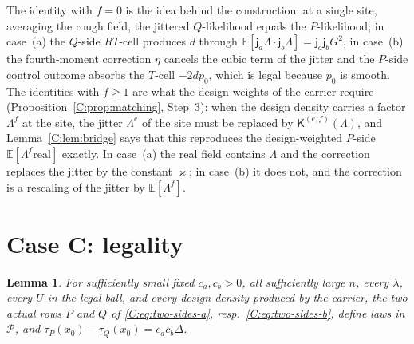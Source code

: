 \documentclass[11pt]{article}
\newtheorem{lemma}[lemma]{Lemma}
\newcommand{\E}{\mathbb{E}}
\newcommand{\cP}{\mathcal{P}}
\newcommand{\ja}{\mathsf{j}_a}
\newcommand{\jb}{\mathsf{j}_b}
\newcommand{\K}{\mathsf{K}}
\newcommand{\real}{\mathrm{real}}
\begin{document}
The identity with \(f=0\) is the idea behind the construction: at a
single site, averaging the rough field, the jittered \(Q\)-likelihood
equals the \(P\)-likelihood; in case~(a) the \(Q\)-side \(RT\)-cell
produces \(d\) through \(\E[\ja\Lambda\cdot\jb\Lambda]=\ja\jb G^2\), in case~(b)
the fourth-moment correction \(\eta\) cancels the cubic term of the
jitter and the \(P\)-side control outcome absorbs the \(T\)-cell
\(-2dp_0\), which is legal because \(p_0\) is smooth.  The identities
with \(f\ge1\) are what the design weights of the carrier require
(Proposition~\ref{C:prop:matching}, Step~3): when the design density
carries a factor \(\Lambda^f\) at the site, the jitter \(\Lambda^e\) of
the site must be replaced by \(\K^{(e,f)}(\Lambda)\), and
Lemma~\ref{C:lem:bridge} says that this reproduces the design-weighted
\(P\)-side \(\E[\Lambda^f\real]\) exactly.  In case~(a) the real field
contains \(\Lambda\) and the correction replaces the jitter by the
constant \(\varkappa\); in case~(b) it does not, and the correction is a
rescaling of the jitter by \(\E[\Lambda^f]\).

\section{Case C: legality}\label{C:sec:legal}

\begin{lemma}\label{C:lem:legal}
For sufficiently small fixed \(c_a,c_b>0\), all sufficiently large \(n\),
every \(\lambda\), every \(U\) in the legal ball, and every design density
produced by the carrier, the two actual rows \(P\) and \(Q\) of
\eqref{C:eq:two-sides-a}, resp.\ \eqref{C:eq:two-sides-b}, define laws in
\(\cP\), and
\(\tau_P(x_0)-\tau_Q(x_0)=c_ac_b\Delta\).
\end{lemma}
\end{document}
